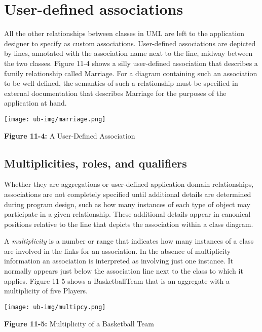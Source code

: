 \section{User-defined associations}

All the other relationships between classes in UML are left
to the application designer to specify as custom associations.
User-defined associations are depicted by lines, annotated with the
association name next to the line, midway between the two classes.
Figure 11-4 shows a silly user-defined association that describes a
family relationship called Marriage. For a diagram containing such an
association to be well defined, the semantics of such a relationship
must be specified in external documentation that describes Marriage for
the purposes of the application at hand.

\begin{center}
\texttt{[image: ub-img/marriage.png]}

{\sffamily\bfseries Figure 11-4:}
{\sffamily A User-Defined Association}
\end{center}

\subsection*{Multiplicities, roles, and qualifiers}

Whether they are aggregations or user-defined application domain
relationships, associations are not completely specified until
additional details are determined during program design, such as how
many instances of each type of object may participate in a given
relationship. These additional details appear in canonical positions
relative to the line that depicts the association within a class
diagram.

A \textit{multiplicity} is a number or range that
indicates how many instances of a class are involved in the links for
an association. In the absence of multiplicity information an
association is interpreted as involving just one instance. It normally
appears just below the association line next to the class to which it
applies. Figure 11-5 shows a BasketballTeam that is an aggregate with a
multiplicity of five Players.

\begin{center}
\texttt{[image: ub-img/multipcy.png]}

{\sffamily\bfseries Figure 11-5:}
{\sffamily Multiplicity of a Basketball Team}
\end{center}

